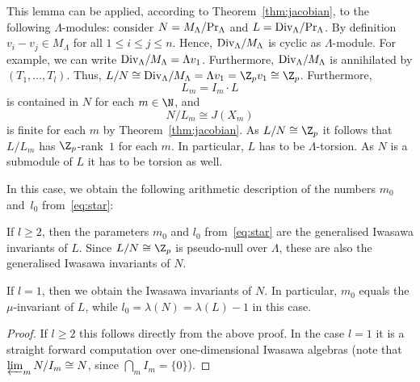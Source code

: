 This lemma can be applied, according to Theorem~\ref{thm:jacobian}, to the following $\Lambda$-modules: consider ${N = M_\Lambda/\textup{Pr}_\Lambda}$ and ${L = \textup{Div}_\Lambda/\textup{Pr}_\Lambda}$. By definition $v_i-v_j\in M_\Lambda$ for all $1\le i\le j\le n$. Hence, $\textup{Div}_\Lambda/M_\Lambda$ is cyclic as $\Lambda$-module. For example, we can write ${\textup{Div}_\Lambda/M_\Lambda = \Lambda v_1}$. Furthermore, $\textup{Div}_\Lambda/M_\Lambda$ is annihilated by $(T_1,\dots, T_l)$. Thus,  ${L/N\cong \textup{Div}_\Lambda/M_\Lambda = \Lambda v_1 = \Z_p v_1 \cong \Z_p}$. Furthermore, 
\[ L_m = I_m \cdot L \] 
is contained in $N$ for each ${m \in \N}$, and 
\[ N/L_m \cong J(X_m) \] 
is finite for each $m$ by Theorem~\ref{thm:jacobian}. As $L/N\cong \Z_p$ it follows that $L/L_m$ has $\Z_p$-rank~$1$ for each $m$. In particular, $L$ has to be $\Lambda$-torsion. As $N$ is a submodule of $L$ it has to be torsion as well.

In this case, we obtain the following arithmetic description of the numbers $m_0$ and~$l_0$ from~\eqref{eq:star}: 
\begin{coro} \label{cor:zusammenhangzuN} 
	If $l\ge 2$, then the parameters $m_0$ and $l_0$ from~\eqref{eq:star} are the generalised Iwasawa invariants of $L$. Since ${L/N \cong \Z_p}$ is pseudo-null over $\Lambda$, these are also the generalised Iwasawa invariants of $N$. 
	
	If $l=1$, then we obtain the Iwasawa invariants of $N$. In particular, $m_0$ equals the $\mu$-invariant of $L$, while ${l_0=\lambda(N) = \lambda(L)-1}$ in this case.
\end{coro}
\begin{proof}
	If $l\ge 2$ this follows directly from the above proof. In the case $l=1$ it is a straight forward computation over one-dimensional Iwasawa algebras (note that ${\varprojlim_m N/I_m \cong N}$, since ${\bigcap_m I_m = \{0\}}$).
\end{proof} 


